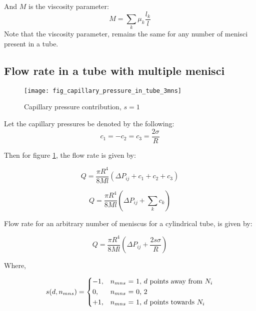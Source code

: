 	And $M$ is the viscosity parameter:
	\begin{equation}
		M = \sum_{k} \mu_{k} \frac{l_{k}}{l}
	\end{equation}
	Note that the viscosity parameter, remains the same for any number of menisci present in a tube.
	
\subsection{Flow rate in a tube with multiple menisci} \label{sec:multi-menisci-flow-rate}
	\begin{figure}[H]
		\centering
		\texttt{[image: fig\_capillary\_pressure\_in\_tube\_3mns]}
		\caption{Capillary pressure contribution, $s = 1$}
		\label{fig:capillary_pressure_in_tube_3mns}
	\end{figure}
	
	Let the capillary pressures be denoted by the following:
	\begin{equation}
		c_1 = -c_2 = c_3 = \frac{2 \sigma}{R}
	\end{equation}
	
	Then for figure \ref{fig:capillary_pressure_in_tube_3mns}, the flow rate is given by:
	
	\begin{equation}
		Q = \frac{\pi R^4}{8Ml} \left( \Delta P_{ij} + c_1 + c_2 + c_3 \right)
	\end{equation}
	
	\begin{equation}
		Q = \frac{\pi R^4}{8Ml} \left( \Delta P_{ij} + \sum_{k} c_{k} \right)
	\end{equation}
	
	Flow rate for an arbitrary number of meniscus for a cylindrical tube, is given by:
	
	\begin{equation} \label{eq:main-flow-rate-with-s}
		\boxed{Q = \frac{\pi R^4}{8Ml} \left( \Delta P_{ij} + \frac{2s \sigma}{R} \right)}
	\end{equation}
	
	Where,
	
	\begin{equation} \label{eq:sign-func-def}
		s(d, n_{mns}) = 
		\begin{dcases}
			-1,&\text{$n_{mns}$ = 1, $d$ points away from $N_{i}$}\\
			0,&\text{$n_{mns}$ = 0, 2}\\
			+1,&\text{$n_{mns}$ = 1, $d$ points towards $N_{i}$}
		\end{dcases}
	\end{equation}
	
